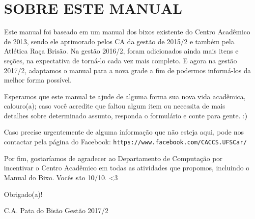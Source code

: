 \section{SOBRE ESTE MANUAL}
Este manual foi baseado em um manual dos bixos existente do Centro Acadêmico de 2013, sendo ele aprimorado pelos CA da gestão de 2015/2 e também pela Atlética Raça Brisão. Na gestão 2016/2, foram adicionados ainda mais itens e seções, na expectativa de torná-lo cada vez mais completo. E agora na gestão 2017/2, adaptamos o manual para a nova grade a fim de podermos informá-los da melhor forma possível.

Esperamos que este manual te ajude de alguma forma sua nova vida acadêmica, calouro(a); caso você acredite que faltou algum item ou necessita de mais detalhes sobre determinado assunto, responda o formulário e conte para gente. :)

Caso precise urgentemente de alguma informação que não esteja aqui, pode nos contactar pela página do Facebook: \texttt{https://www.facebook.com/CACCS.UFSCar/}

Por fim, gostaríamos de agradecer ao Departamento de Computação por incentivar o Centro Acadêmico em todas as atividades que propomos, incluindo o Manual do Bixo. Vocês são 10/10. <3

\begin{flushright}
  Obrigado(a)!

  C.A. Pata do Bisão Gestão 2017/2
\end{flushright}
